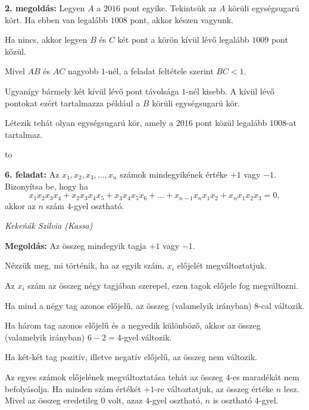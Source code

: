 \documentclass[a4paper,10pt]{article}
\newcommand{\ki}[2]{\hfill {\it #1 (#2)}\medskip}
\newcommand{\vonal}{\hbox to \hsize{\hskip2truecm\hrulefill\hskip2truecm}}
\begin{document}
\medskip

{\bf 2. megoldás: } Legyen $A$ a $2016$ pont egyike. Tekintsük az $A$ körüli egységsugarú kört.
Ha ebben van legalább $1008$ pont, akkor készen vagyunk. 

\smallskip

\noindent Ha nincs, akkor legyen $B$ és $C$ két pont a körön kívül lévő legalább $1009$ pont közül. 

\smallskip

\noindent Mivel $AB$ és $AC$ nagyobb $1$-nél, a feladat feltétele szerint $BC < 1$.

\smallskip

\noindent Ugyanígy bármely két kívül lévő pont távolsága $1$-nél kisebb. 
A kívül lévő pontokat ezért tartalmazza például a $B$ körüli egységsugarú kör.

\smallskip

\noindent Létezik tehát olyan egységsugarú kör, amely a $2016$ pont közül legalább $1008$-at tartalmaz.

\vonal

{\bf 6. feladat: } Az $x_1, x_2, x_3, \ldots, x_n$ számok mindegyikének értéke $+1$ vagy $-1$. 
Bizonyítsa be, hogy ha  
\[x_1x_2x_3x_4+x_2x_3x_4x_5+x_3x_4x_5x_6+\ldots+x_{n-1}x_nx_1x_2+x_nx_1x_2x_3=0,\] 
akkor az $n$ szám $4$-gyel osztható.

\ki{Keke\v{n}ák Szilvia}{Kassa}\medskip

{\bf Megoldás: } Az összeg mindegyik tagja $+1$ vagy $-1$.

\smallskip

\noindent Nézzük meg, mi történik, ha az egyik szám, $x_i$ előjelét megváltoztatjuk.

\smallskip

\noindent Az $x_i$ szám az összeg négy tagjában szerepel, ezen tagok előjele fog megváltozni.

\noindent Ha mind a négy tag azonos előjelű, az összeg (valamelyik irányban) $8$-cal változik.

\noindent Ha három tag azonos előjelű és a negyedik különböző, akkor az összeg (valamelyik irányban) $6-2 = 4$-gyel változik.

\noindent Ha két-két tag pozitív, illetve negatív előjelű, az összeg nem változik.

\smallskip

\noindent Az egyes számok előjelének megváltoztatása tehát az összeg $4$-es maradékát nem befolyásolja.
Ha minden szám értékét $+1$-re változtatjuk, az összeg értéke $n$ lesz.
Mivel az összeg eredetileg $0$ volt, azaz $4$-gyel osztható, $n$ is osztható $4$-gyel.
\end{document}
